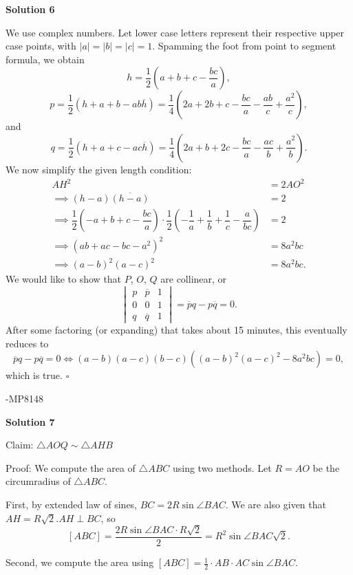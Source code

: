 \begin{enumerate}
 



\textbf{Solution 6}

We use complex numbers. Let lower case letters represent their respective upper case points, with $|a| = |b| = |c| = 1$. Spamming the foot from point to segment formula, we obtain 
 \[h = \dfrac{1}{2}\left(a+b+c-\dfrac{bc}{a}\right),\] 
 \[p = \dfrac{1}{2}(h+a+b-ab\overline{h}) = \dfrac{1}{4}\left(2a+2b+c-\dfrac{bc}{a}-\dfrac{ab}{c}+\dfrac{a^2}{c}\right),\] and 
 \[q = \dfrac{1}{2}(h+a+c-ac\overline{h}) = \dfrac{1}{4}\left(2a+b+2c-\dfrac{bc}{a}-\dfrac{ac}{b}+\dfrac{a^2}{b}\right).\] We now simplify the given length condition: 
 \begin{align*} AH^2 &= 2AO^2 \\ \implies (h-a)\overline{(h-a)} &= 2 \\ \implies \dfrac{1}{2}\left(-a+b+c-\dfrac{bc}{a}\right) \cdot \dfrac{1}{2}\left(-\dfrac{1}{a}+\dfrac{1}{b}+\dfrac{1}{c}-\dfrac{a}{bc}\right) &= 2 \\ \implies (ab+ac-bc-a^2)^2 &= 8a^2bc \\ \implies (a-b)^2(a-c)^2 &= 8a^2bc.\end{align*}
 We would like to show that $P$, $O$, $Q$ are collinear, or 
 \[\begin{vmatrix} p & \overline{p} & 1 \\ 0 & 0 & 1 \\ q & \overline{q} & 1 \end{vmatrix} = \overline{p}q - p\overline{q} = 0.\] After some factoring (or expanding) that takes about 15 minutes, this eventually reduces to 
 \[\overline{p}q - p\overline{q} = 0 \iff (a-b)(a-c)(b-c)((a-b)^2(a-c)^2 - 8a^2bc) = 0,\] which is true. $\square$

 -MP8148

 



\textbf{Solution 7}

Claim: $\triangle AOQ \sim \triangle AHB$

 Proof: We compute the area of $\triangle ABC$ using two methods. Let $R=AO$ be the circumradius of $\triangle ABC$.

 First, by extended law of sines, $BC=2R \sin \angle BAC$. We are also given that $AH= R \sqrt{2}$.$AH \perp BC$, so 
 \[[ABC]=\frac{2R \sin \angle BAC \cdot R \sqrt{2}}{2}=R^2 \sin \angle BAC \sqrt{2}.\]

 Second, we compute the area using $[ABC]=\frac{1}{2} \cdot AB \cdot AC \sin \angle BAC$.


\end{enumerate}
